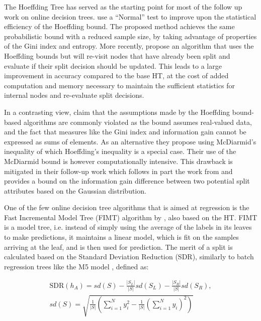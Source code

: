 The Hoeffding Tree has served as the starting point for most of the follow up work on
online decision trees. \citet{vfdt-normal} use a ``Normal'' test to improve
upon the statistical efficiency of the Hoeffding bound. The proposed method achieves
the same probabilistic bound with a reduced sample size, by taking
advantage of properties of the Gini index and entropy. More recently,
\citet{efdt} propose an algorithm that uses the Hoeffding bounds but
will re-visit nodes that have already been split and evaluate if their
split decision should be updated. This leads to a large improvement in accuracy
compared to the base HT,
at the cost of added computation and memory necessary to maintain
the sufficient statistics for internal nodes and re-evaluate split
decisions.

In a contrasting view, \citet{vfdt-mcdiarmid} claim that the assumptions made
by the Hoeffding bound-based algorithms are commonly violated as the bound assumes
real-valued data, and the fact that measures like the Gini index and information
gain cannot be expressed as sums of elements. As an alternative they propose
using McDiarmid's inequality of which Hoeffding's inequality is a special case.
Their use of the McDiarmid
bound is however computationally intensive. This drawback is mitigated
in their follow-up work \cite{vfdt-gaussian} which follows in part the work from \citet{vfdt-normal}
and provides a bound on the information gain difference between two potential
split attributes based on the Gaussian distribution.

One of the few online decision tree algorithms that is aimed at regression
is the Fast Incremental Model Tree (FIMT) algorithm by \citet{fimt}, also
based on the HT. FIMT
is a model tree, i.e. instead of simply using the average of the labels
in its leaves to make predictions, it maintains a linear model, which is
fit on the samples arriving at the leaf, and is then used for prediction.
The merit of a split is calculated based on the Standard Deviation Reduction (SDR),
similarly to batch regression trees like the M5 model \cite{m5-tree}, defined as:

\begin{equation}
\begin{split}
\text{SDR}(h_A)=sd(S)-\frac{|S_L|}{|S|}sd\left(S_{L}\right)-\frac{|S_R|}{|S|}sd\left(S_{R}\right), \\
sd(S) = \sqrt{\frac{1}{|S|}\left(\sum_{i=1}^{N}y_{i}^{2}-\frac{1}{|S|}\left(\sum_{i=1}^{N}y_{i}\right)^{2}\right)}
\end{split}
\end{equation}

